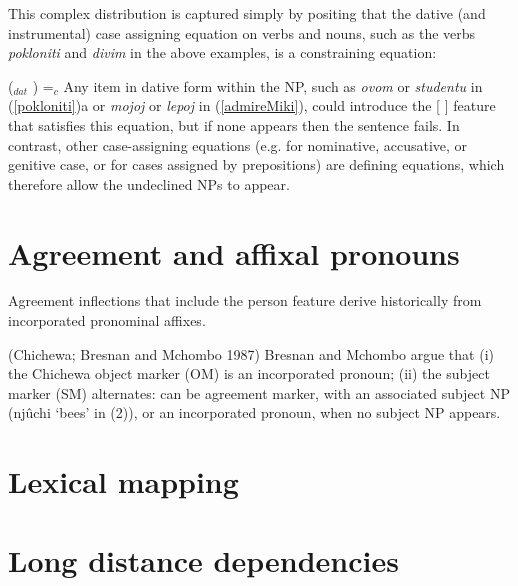 \documentclass[output=paper
                ,modfonts
                ,nonflat
	        ,collection
	        ,collectionchapter
	        ,collectiontoclongg
 	        ,biblatex
                ,babelshorthands
                ,newtxmath
                ,draftmode
                ,colorlinks, citecolor=brown
]{./langsci/langscibook}
\begin{document}
\noindent
This complex distribution is captured simply by positing that the dative (and instrumental) case assigning equation on verbs and nouns, such as the verbs \textit{pokloniti} and \textit{divim} in the above examples, is a constraining equation:

\ea
(\up {}$_{dat}$ ) =$_c$ 
\z
Any item in dative form within the NP, such as \textit{ovom} or \textit{studentu} in (\ref{pokloniti})a or \textit{mojoj} or \textit{lepoj} in (\ref{admireMiki}), could introduce the [ ] feature that satisfies this equation, but if none appears then the sentence fails.  In contrast, other case-assigning equations (e.g. for nominative, accusative, or genitive case, or for cases assigned by prepositions) are defining equations, which therefore allow the undeclined NPs to appear.  

\section{Agreement and affixal pronouns}

Agreement inflections that include the person feature derive historically from incorporated pronominal affixes.  

 \begin{exe} 
\ex	\label{bees}
\begin{xlist}
 \end{xlist}
\end{exe}

(Chichewa; Bresnan and Mchombo 1987)
Bresnan and Mchombo argue that
(i) the Chichewa object marker (OM) is an incorporated pronoun;
(ii) the subject marker (SM) alternates: can be agreement marker, with an associated subject NP (njûchi ‘bees’ in (2)), or an incorporated pronoun, when no subject NP appears.
                  
\section{Lexical mapping}

\section{Long distance dependencies}
\end{document}

